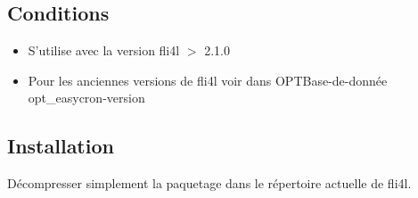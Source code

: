 \begin{description}
\subsection{Conditions}

\begin{itemize}
\item  S'utilise avec la version fli4l $>$ 2.1.0
\item  Pour les anciennes versions de fli4l voir dans OPT\-Base-de-donnée
      opt\_easycron-version
\end{itemize}


\subsection{Installation}

  Décompresser simplement la paquetage  dans le répertoire
  actuelle de fli4l.
\end{description}

